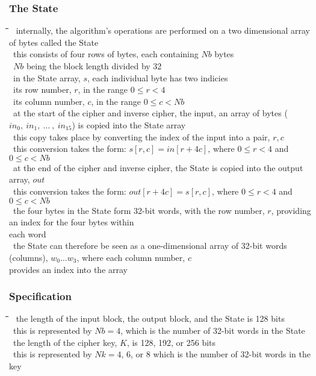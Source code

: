 \documentclass[10pt,letterpaper]{scrartcl}
\newcommand{\tbul}{\textbullet}
\newcommand{\tend}{\>\textendash}
\newcommand{\tasc}{\>\>\textasteriskcentered}
\newcommand{\tabDef}{\hspace{2em}\=\hspace{2em}\=\hspace{2em}\=\hspace{2em}\=\kill}
\begin{document}
\subsubsection*{The State}\begin{tabbing}\tabDef
\tbul\ internally, the algorithm's operations are performed on a two dimensional array of bytes called the State \\
\tbul\ this consists of four rows of bytes, each containing $Nb$ bytes \\
    \tend\ $Nb$ being the block length divided by 32 \\
\tbul\ in the State array, $s$, each individual byte has two indicies \\
    \tend\ its row number, $r$, in the range $0\leq r < 4$ \\
    \tend\ its column number, $c$, in the range $0\leq c < Nb$\\
\tbul\ at the start of the cipher and inverse cipher, the input, an array of bytes ($in_0,\ in_1,\ \ldots\ ,\ in_{15}$) is copied into the State array \\
    \tend\ this copy takes place by converting the index of the input into a pair, $r,c$ \\
        \tasc\ this conversion takes the form: $s[r,c]=in[r+4c]$, where $0\leq r < 4$ and $0\leq c < Nb$\\
    \tend\ at the end of the cipher and inverse cipher, the State is copied into the output array, $out$ \\
        \tasc\ this conversion takes the form: $out[r+4c]=s[r,c]$, where $0\leq r < 4$ and $0\leq c < Nb$ \\
\tbul\ the four bytes in the State form 32-bit words, with the row number, $r$, providing an index for the four bytes within\\ each word \\
\tbul\ the State can therefore be seen as a one-dimensional array of 32-bit words (columns), $w_0\ldots w_3$, where each column number, $c$\\ provides an index into the array\end{tabbing}
\subsubsection*{Specification}\begin{tabbing}\tabDef
\tbul\ the length of the input block, the output block, and the State is 128 bits \\
    \tend\ this is represented by $Nb=4$, which is the number of 32-bit words in the State\\
\tbul\ the length of the cipher key, $K$, is 128, 192, or 256 bits \\
    \tend\ this is represented by $Nk=4$, $6$, or $8$ which is the number of 32-bit words in the key \\
\end{tabbing}
\end{document}
